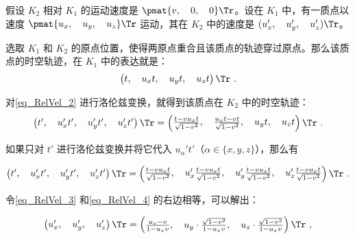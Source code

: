 假设 $K_2$ 相对 $K_1$ 的运动速度是 $\pmat{v,\quad 0,\quad 0}\Tr$。设在 $K_1$ 中，有一质点以速度 $\pmat{u_x,\quad u_y,\quad u_z}\Tr$ 运动，其在 $K_2$ 中的速度是 $(u_x',\quad u_y',\quad u_z')\Tr$。

选取 $K_1$ 和 $K_2$ 的原点位置，使得两原点重合且该质点的轨迹穿过原点。那么该质点的时空轨迹，在 $K_1$ 中的表达就是：
\begin{equation}\label{eq_RelVel_2}
\left(\begin{matrix}t,\quad u_xt,\quad u_yt,\quad u_zt\end{matrix} \right)\Tr ~.
\end{equation}

对\autoref{eq_RelVel_2} 进行洛伦兹变换，就得到该质点在 $K_2$ 中的时空轨迹：
\begin{equation}\label{eq_RelVel_3}
\left(\begin{matrix}t',\quad u_x't',\quad u_y't',\quad u_z't'\end{matrix} \right)\Tr 
= 
\left(\begin{matrix}\frac{t-vu_xt}{\sqrt{1-v^2}},\quad\frac{u_xt-vt}{\sqrt{1-v^2}},\quad u_yt,\quad u_zt\end{matrix} \right)\Tr ~.
\end{equation}

如果只对 $t'$ 进行洛伦兹变换并将它代入 $u_\alpha't'$（$\alpha\in\{x, y, z\}$），那么有

\begin{equation}\label{eq_RelVel_4}
\left(\begin{matrix}t',\quad u_x't',\quad u_y't',\quad u_z't'\end{matrix} \right)\Tr 
= 
\left(\begin{matrix}\frac{t-vu_xt}{\sqrt{1-v^2}},\quad u_x'\frac{t-vu_xt}{\sqrt{1-v^2}},\quad u_y'\frac{t-vu_xt}{\sqrt{1-v^2}},\quad u_z'\frac{t-vu_xt}{\sqrt{1-v^2}}\end{matrix} \right)\Tr ~.
\end{equation}

令\autoref{eq_RelVel_3} 和\autoref{eq_RelVel_4} 的右边相等，可以解出：

\begin{equation}
\left(\begin{matrix}u_x',\quad u_y',\quad u_z'\end{matrix} \right)\Tr 
= 
\left(\begin{matrix}\frac{u_x-v}{1-u_xv},\quad u_y\cdot\frac{\sqrt{1-v^2}}{1-u_xv},\quad u_z\cdot\frac{\sqrt{1-v^2}}{1-u_xv}\end{matrix} \right)\Tr~, 
\end{equation}

